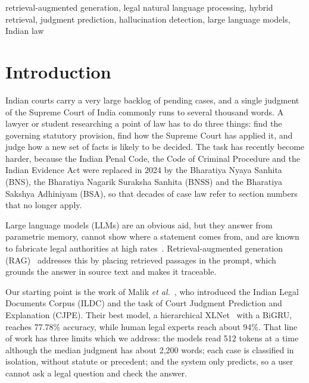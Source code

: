 \documentclass[conference]{IEEEtran}
\begin{document}
\begin{IEEEkeywords}
retrieval-augmented generation, legal natural language processing, hybrid retrieval, judgment prediction, hallucination detection, large language models, Indian law
\end{IEEEkeywords}

\section{Introduction}
Indian courts carry a very large backlog of pending cases, and a single judgment of the Supreme Court of India commonly runs to several thousand words. A lawyer or student researching a point of law has to do three things: find the governing statutory provision, find how the Supreme Court has applied it, and judge how a new set of facts is likely to be decided. The task has recently become harder, because the Indian Penal Code, the Code of Criminal Procedure and the Indian Evidence Act were replaced in 2024 by the Bharatiya Nyaya Sanhita (BNS), the Bharatiya Nagarik Suraksha Sanhita (BNSS) and the Bharatiya Sakshya Adhiniyam (BSA), so that decades of case law refer to section numbers that no longer apply.

Large language models (LLMs) are an obvious aid, but they answer from parametric memory, cannot show where a statement comes from, and are known to fabricate legal authorities at high rates~\cite{dahl2024}. Retrieval-augmented generation (RAG)~\cite{lewis2020} addresses this by placing retrieved passages in the prompt, which grounds the answer in source text and makes it traceable.

Our starting point is the work of Malik \emph{et al.}~\cite{malik2021}, who introduced the Indian Legal Documents Corpus (ILDC) and the task of Court Judgment Prediction and Explanation (CJPE). Their best model, a hierarchical XLNet~\cite{yang2019} with a BiGRU, reaches 77.78\% accuracy, while human legal experts reach about 94\%. That line of work has three limits which we address: the models read 512 tokens at a time although the median judgment has about 2,200 words; each case is classified in isolation, without statute or precedent; and the system only predicts, so a user cannot ask a legal question and check the answer.
\end{document}
